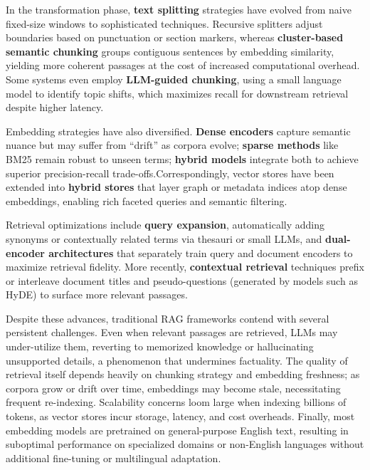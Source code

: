 \documentclass[12pt,twoside]{report}
\begin{document}
In the transformation phase, \textbf{text splitting} strategies have evolved from naive fixed-size windows to sophisticated techniques. Recursive splitters adjust boundaries based on punctuation or section markers, whereas \textbf{cluster-based semantic chunking} groups contiguous sentences by embedding similarity, yielding more coherent passages at the cost of increased computational overhead. Some systems even employ \textbf{LLM-guided chunking}, using a small language model to identify topic shifts, which maximizes recall for downstream retrieval despite higher latency.

Embedding strategies have also diversified. \textbf{Dense encoders} capture semantic nuance but may suffer from “drift” as corpora evolve; \textbf{sparse methods} like BM25 remain robust to unseen terms; \textbf{hybrid models} integrate both to achieve superior precision-recall trade-offs.Correspondingly, vector stores have been extended into \textbf{hybrid stores} that layer graph or metadata indices atop dense embeddings, enabling rich faceted queries and semantic filtering.

Retrieval optimizations include \textbf{query expansion}, automatically adding synonyms or contextually related terms via thesauri or small LLMs, and \textbf{dual-encoder architectures} that separately train query and document encoders to maximize retrieval fidelity. More recently, \textbf{contextual retrieval} techniques prefix or interleave document titles and pseudo-questions (generated by models such as HyDE) to surface more relevant passages.

Despite these advances, traditional RAG frameworks contend with several persistent challenges. Even when relevant passages are retrieved, LLMs may under-utilize them, reverting to memorized knowledge or hallucinating unsupported details, a phenomenon that undermines factuality. The quality of retrieval itself depends heavily on chunking strategy and embedding freshness; as corpora grow or drift over time, embeddings may become stale, necessitating frequent re-indexing. Scalability concerns loom large when indexing billions of tokens, as vector stores incur storage, latency, and cost overheads. Finally, most embedding models are pretrained on general-purpose English text, resulting in suboptimal performance on specialized domains or non-English languages without additional fine-tuning or multilingual adaptation.
\end{document}
